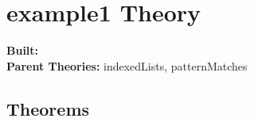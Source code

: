 \documentclass[11pt, twoside]{article}
\begin{document}


\tableofcontents
\cleardoublepage
\HOLpagestyle

\section{example1 Theory}
\begin{flushleft}
\textbf{Built:} \HOLexampleOneDate \\[2pt]
\textbf{Parent Theories:} indexedLists, patternMatches
\end{flushleft}



\subsection{Theorems}

\HOLexampleOneTheorems

\HOLindex
\end{document}

